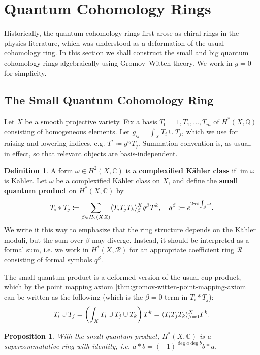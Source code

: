 \documentclass{report}
\theoremstyle{plain}
\newtheorem{proposition}[theorem]{Proposition}
\theoremstyle{definition}
\newtheorem{definition}[theorem]{Definition}
\theoremstyle{remark}
\newcommand{\bC}{\mathbb{C}}
\newcommand{\bQ}{\mathbb{Q}}
\newcommand{\bZ}{\mathbb{Z}}
\newcommand{\cR}{\mathcal{R}}
\DeclareMathOperator{\im}{im}
\DeclarePairedDelimiter{\inner}{\langle}{\rangle}
\begin{document}
\section{Quantum Cohomology Rings}

Historically, the quantum cohomology rings first arose as chiral rings
in the physics literature, which was understood as a deformation of
the usual cohomology ring. In this section we shall construct the
small and big quantum cohomology rings algebraically using
Gromov--Witten theory. We work in $g=0$ for simplicity.

\subsection{The Small Quantum Cohomology Ring}

Let $X$ be a smooth projective variety. Fix a basis $T_0 = 1, T_1,
\ldots, T_m$ of $H^*(X, \bQ)$ consisting of homogeneous elements. Let
$g_{ij} = \int_X T_i \cup T_j$, which we use for raising and lowering
indices, e.g. $T^i \coloneqq g^{ij} T_j$. Summation convention is, as
usual, in effect, so that relevant objects are basis-independent.

\begin{definition} \label{def:small-quantum-product}
  A form $\omega \in H^2(X, \bC)$ is a {\bf complexified K\"ahler
    class} if $\im \omega$ is K\"ahler. Let $\omega$ be a complexified
  K\"ahler class on $X$, and define the {\bf small quantum product} on
  $H^*(X, \bC)$ by
  \[ T_i * T_j \coloneqq \sum_{\beta \in H_2(X, \bZ)} \inner{T_i T_j T_k}_\beta^X q^\beta T^k, \quad q^\beta \coloneqq e^{2\pi i \int_\beta \omega}. \]
  We write it this way to emphasize that the ring structure depends on
  the K\"ahler moduli, but the sum over $\beta$ may diverge. Instead,
  it should be interpreted as a formal sum, i.e. we work in $H^*(X,
  \cR)$ for an appropriate coefficient ring $\cR$ consisting of formal
  symbols $q^\beta$.
\end{definition}

The small quantum product is a deformed version of the usual cup
product, which by the point mapping axiom
\ref{thm:gromov-witten-point-mapping-axiom} can be written as the
following (which is the $\beta = 0$ term in $T_i * T_j$):
\[ T_i \cup T_j = \left(\int_X T_i \cup T_j \cup T_k\right) T^k = \inner{T_iT_jT_k}_{\beta=0}^X T^k. \]

\begin{proposition} \label{thm:small-quantum-cohomology-ring}
  With the small quantum product, $H^*(X, \bC)$ is a supercommutative
  ring with identity, i.e. $a * b = (-1)^{\deg a \deg b} b * a$.
\end{proposition}
\end{document}
